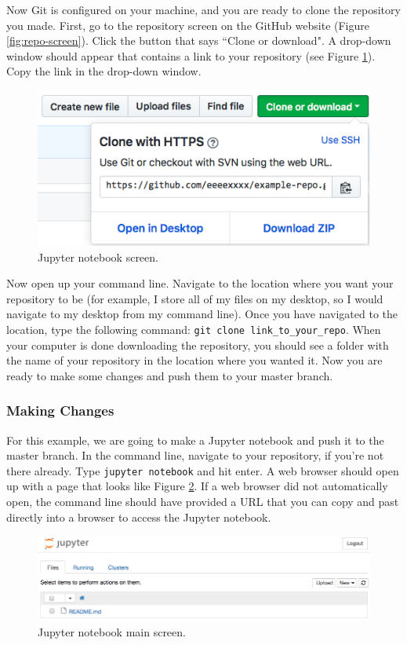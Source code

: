\documentclass[11pt,a4paper]{article}
\begin{document}
Now Git is configured on your machine, and you are ready to clone the repository you made.
First, go to the repository screen on the GitHub website (Figure \ref{fig:repo-screen}).
Click the button that says ``Clone or download".
A drop-down window should appear that contains a link to your repository (see Figure \ref{fig:clone-screen}).
Copy the link in the drop-down window.

\begin{figure}[h]
\centering
\includegraphics[width=.7\textwidth]{figures/clone_screen.png}
\caption{Jupyter notebook screen.}
\label{fig:clone-screen}
\end{figure}

Now open up your command line.
Navigate to the location where you want your repository to be (for example, I store all of my files on my desktop, so I would navigate to my desktop from my command line).
Once you have navigated to the location, type the following command: \texttt{git clone link\_to\_your\_repo}.
When your computer is done downloading the repository, you should see a folder with the name of your repository in the location where you wanted it.
Now you are ready to make some changes and push them to your master branch.

\subsubsection*{Making Changes}
For this example, we are going to make a Jupyter notebook and push it to the master branch.
In the command line, navigate to your repository, if you're not there already.
Type \texttt{jupyter notebook} and hit enter.
A web browser should open up with a page that looks like Figure \ref{fig:jupyter-dir}.
If a web browser did not automatically open, the command line should have provided a URL that you can copy and past directly into a browser to access the Jupyter notebook.

\begin{figure}[h]
\centering
\includegraphics[width=.7\textwidth]{figures/jupyter_dir.png}
\caption{Jupyter notebook main screen.}
\label{fig:jupyter-dir}
\end{figure}
\end{document}
